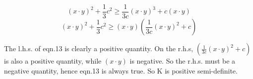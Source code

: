 \documentclass[12pt]{article}
\begin{document}
\begin{equation}
     (x \cdot y)^2 + \frac{1}{3}c^2 \geq \frac{1}{3c}(x \cdot y)^3  + c(x \cdot y)
\end{equation}
\begin{equation}
     (x \cdot y)^2 + \frac{1}{3}c^2 \geq (x \cdot y)\left(\frac{1}{3c}(x \cdot y)^2  + c\right)
\end{equation}

The l.h.s. of eqn.13 is clearly a positive quantity. On the r.h.s, $\left(\frac{1}{3c}(x \cdot y)^2  + c\right)$ is 
also a positive quantity, while $(x \cdot y)$ is negative. So the r.h.s. must be a negative quantity, hence 
eqn.13 is always true. So K is positive semi-definite. 
\end{document}
